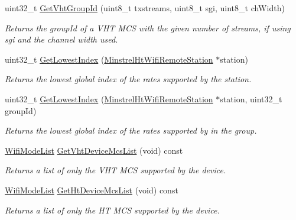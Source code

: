 \begin{DoxyCompactItemize}
uint32\+\_\+t \hyperlink{classns3_1_1MinstrelHtWifiManager_ae8425dbd449d4402c61941ae78ed8fb9}{Get\+Vht\+Group\+Id} (uint8\+\_\+t txstreams, uint8\+\_\+t sgi, uint8\+\_\+t ch\+Width)
\begin{DoxyCompactList}\small\item\em Returns the group\+Id of a V\+HT M\+CS with the given number of streams, if using sgi and the channel width used. \end{DoxyCompactList}\item 
uint32\+\_\+t \hyperlink{classns3_1_1MinstrelHtWifiManager_ae4e498be04ca255831cdf42d9ff24eec}{Get\+Lowest\+Index} (\hyperlink{structns3_1_1MinstrelHtWifiRemoteStation}{Minstrel\+Ht\+Wifi\+Remote\+Station} $\ast$station)
\begin{DoxyCompactList}\small\item\em Returns the lowest global index of the rates supported by the station. \end{DoxyCompactList}\item 
uint32\+\_\+t \hyperlink{classns3_1_1MinstrelHtWifiManager_afd34eac817675cfa9baa84a8ad4171f7}{Get\+Lowest\+Index} (\hyperlink{structns3_1_1MinstrelHtWifiRemoteStation}{Minstrel\+Ht\+Wifi\+Remote\+Station} $\ast$station, uint32\+\_\+t group\+Id)
\begin{DoxyCompactList}\small\item\em Returns the lowest global index of the rates supported by in the group. \end{DoxyCompactList}\item 
\hyperlink{namespacens3_abceecb3f813d2b4af697068f25085024}{Wifi\+Mode\+List} \hyperlink{classns3_1_1MinstrelHtWifiManager_aa3f58bf72c4fe7dd962ce0e99ba211a7}{Get\+Vht\+Device\+Mcs\+List} (void) const 
\begin{DoxyCompactList}\small\item\em Returns a list of only the V\+HT M\+CS supported by the device. \end{DoxyCompactList}\item 
\hyperlink{namespacens3_abceecb3f813d2b4af697068f25085024}{Wifi\+Mode\+List} \hyperlink{classns3_1_1MinstrelHtWifiManager_a51b40cdb077737e007f1c767c11d1424}{Get\+Ht\+Device\+Mcs\+List} (void) const 
\begin{DoxyCompactList}\small\item\em Returns a list of only the HT M\+CS supported by the device. \end{DoxyCompactList}\end{DoxyCompactItemize}
